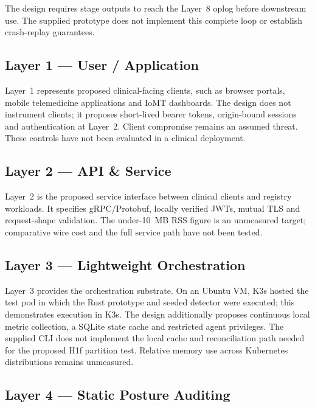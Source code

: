 \documentclass{ieeeaccess}
\begin{document}
The design requires stage outputs to reach the Layer~8 oplog before downstream use. The supplied prototype does not implement this complete loop or establish crash-replay guarantees.

\subsection{Layer 1 --- User / Application}
\label{subsec:layer1}

Layer~1 represents proposed clinical-facing clients, such as browser portals, mobile telemedicine applications and IoMT dashboards. The design does not instrument clients; it proposes short-lived bearer tokens, origin-bound sessions and authentication at Layer~2. Client compromise remains an assumed threat. These controls have not been evaluated in a clinical deployment.

\subsection{Layer 2 --- API \& Service}
\label{subsec:layer2}

Layer~2 is the proposed service interface between clinical clients and registry workloads. It specifies gRPC/Protobuf, locally verified JWTs, mutual TLS and request-shape validation. The under-10~MB RSS figure is an unmeasured target; comparative wire cost and the full service path have not been tested.

\subsection{Layer 3 --- Lightweight Orchestration}
\label{subsec:layer3}

Layer~3 provides the orchestration substrate. On an Ubuntu VM, K3s hosted the test pod in which the Rust prototype and seeded detector were executed; this demonstrates execution in K3s. The design additionally proposes continuous local metric collection, a SQLite state cache and restricted agent privileges. The supplied CLI does not implement the local cache and reconciliation path needed for the proposed H1f partition test. Relative memory use across Kubernetes distributions remains unmeasured.

\subsection{Layer 4 --- Static Posture Auditing}
\label{subsec:layer4}
\end{document}
